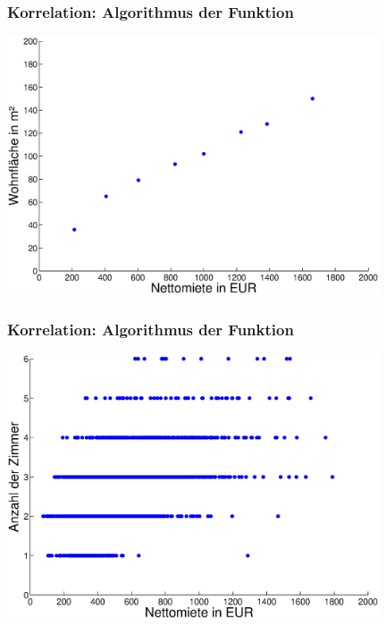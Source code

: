 \documentclass{beamer}
\begin{document}
\begin{frame}
	\frametitle{Korrelation: Algorithmus der Funktion}
	
	\begin{center}
    \includegraphics[width=11cm]{figures/streudiag-nm-wfl-red}
  \end{center}
\end{frame}

\begin{frame}
	\frametitle{Korrelation: Algorithmus der Funktion}
	
	\begin{center}
    \includegraphics[width=11cm]{figures/streudiag-nm-rooms-alle}
  \end{center}
\end{frame}
\end{document}
